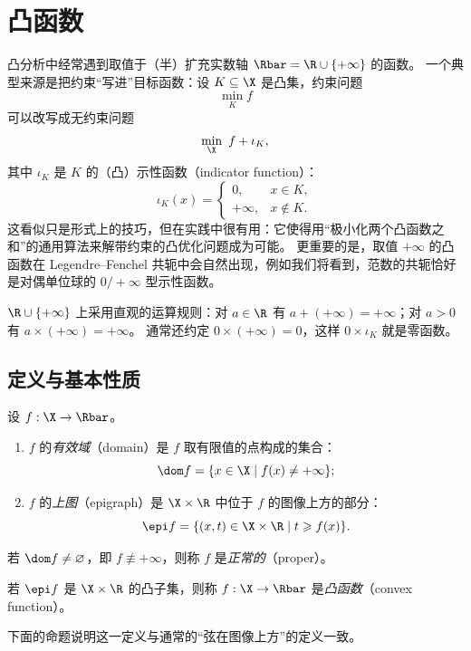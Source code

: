 \chapter{凸函数}
\label{ch:ch02}

凸分析中经常遇到取值于（半）扩充实数轴 $\Rbar = \R\cup\{+\infty\}$ 的函数。
一个典型来源是把约束“写进”目标函数：设 $K\subseteq\X$ 是凸集，约束问题
\[
  \min_{K} f
\]
可以改写成无约束问题
\[
  \min_{\X}\ f + \iota_K ,
\]
其中 $\iota_K$ 是 $K$ 的（凸）示性函数（indicator function）：
\[
  \iota_K(x) =
  \begin{cases}
    0, & x\in K,\\
    +\infty, & x\notin K.
  \end{cases}
\]
这看似只是形式上的技巧，但在实践中很有用：它使得用“极小化两个凸函数之和”的通用算法来解带约束的凸优化问题成为可能。
更重要的是，取值 $+\infty$ 的凸函数在 Legendre--Fenchel 共轭中会自然出现，例如我们将看到，范数的共轭恰好是对偶单位球的 $0/+\infty$ 型示性函数。

$\R\cup\{+\infty\}$ 上采用直观的运算规则：对 $a\in\R$ 有 $a+(+\infty)=+\infty$；对 $a>0$ 有 $a\times(+\infty)=+\infty$。
通常还约定 $0\times(+\infty)=0$，这样 $0\times\iota_K$ 就是零函数。

\section{定义与基本性质}

\begin{definition}[有效域与上图]
\label{def:11}
设 $f:\X\to\Rbar$。
\begin{enumerate}[label=(\roman*)]
  \item $f$ 的\emph{有效域}（domain）是 $f$ 取有限值的点构成的集合：
  \[
    \dom f = \{x\in\X \mid f(x)\neq+\infty\};
  \]
  \item $f$ 的\emph{上图}（epigraph）是 $\X\times\R$ 中位于 $f$ 的图像上方的部分：
  \[
    \epi f = \{(x,t)\in\X\times\R \mid t\geqslant f(x)\}.
  \]
\end{enumerate}
若 $\dom f\neq\varnothing$，即 $f\not\equiv+\infty$，则称 $f$ 是\emph{正常的}（proper）。
\end{definition}

\begin{definition}[凸函数]
\label{def:12}
若 $\epi f$ 是 $\X\times\R$ 的凸子集，则称 $f:\X\to\Rbar$ 是\emph{凸函数}（convex function）。
\end{definition}

下面的命题说明这一定义与通常的“弦在图像上方”的定义一致。

